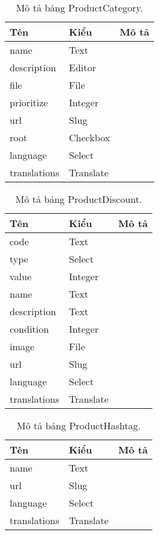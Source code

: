 \begin{table}[p]
\begin{center}
\begin{tabular}{ |l|l|l| } 
	\hline
	Tên & Kiểu & Mô tả \\
	\hline
	name & Text & \dotfill \\
description & Editor & \dotfill \\
file & File & \dotfill \\
prioritize & Integer & \dotfill \\
url & Slug & \dotfill \\
root & Checkbox & \dotfill \\
language & Select & \dotfill \\
translations & Translate & \dotfill \\ 
	\hline
\end{tabular}
	\caption{Mô tả bảng ProductCategory.}
	\label{table:ProductCategory}
\end{center}
\end{table}


\begin{table}[p]
\begin{center}
\begin{tabular}{ |l|l|l| } 
	\hline
	Tên & Kiểu & Mô tả \\
	\hline
	code & Text & \dotfill \\
type & Select & \dotfill \\
value & Integer & \dotfill \\
name & Text & \dotfill \\
description & Text & \dotfill \\
condition & Integer & \dotfill \\
image & File & \dotfill \\
url & Slug & \dotfill \\
language & Select & \dotfill \\
translations & Translate & \dotfill \\ 
	\hline
\end{tabular}
	\caption{Mô tả bảng ProductDiscount.}
	\label{table:ProductDiscount}
\end{center}
\end{table}


\begin{table}[p]
\begin{center}
\begin{tabular}{ |l|l|l| } 
	\hline
	Tên & Kiểu & Mô tả \\
	\hline
	name & Text & \dotfill \\
url & Slug & \dotfill \\
language & Select & \dotfill \\
translations & Translate & \dotfill \\ 
	\hline
\end{tabular}
	\caption{Mô tả bảng ProductHashtag.}
	\label{table:ProductHashtag}
\end{center}
\end{table}


